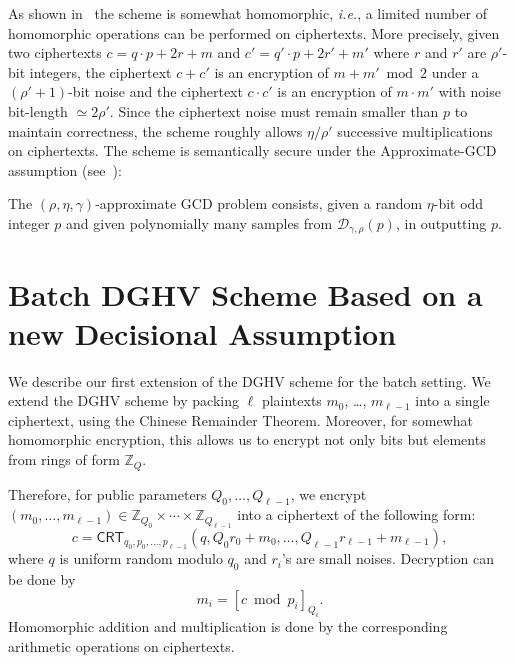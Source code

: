 \documentclass{llncs}
\newcommand{\ie}{\textsl{i.e.}\xspace}
\newcommand{\Z}{{\mathbb Z}}
\newcommand*{\crt}{\ensuremath{\mathsf{CRT}}}
\begin{document}
As shown in~\cite{vDGHV2010} the scheme is somewhat homomorphic, \ie, a
limited number of homomorphic operations can be performed on
ciphertexts. More precisely, given two ciphertexts $c=q \cdot p+2r+m$
and $c'=q' \cdot p+2r'+m'$ where $r$ and $r'$ are $\rho'$-bit
integers, the ciphertext $c+c'$ is an encryption of
$m + m' \bmod 2$ under a $(\rho'+1)$-bit noise and the ciphertext $c \cdot
c'$ is an encryption of $m \cdot m'$ with noise bit-length $\simeq
2 \rho'$. Since the ciphertext noise must remain smaller than $p$ to maintain correctness, 
the scheme roughly allows $\eta/\rho'$ successive multiplications on ciphertexts.
The scheme is semantically secure under the Approximate-GCD assumption
(see~\cite{vDGHV2010}):

\begin{definition}
\label{def:approxGCD}
 The 
  $(\rho,\eta,\gamma)$-approximate GCD problem consists, given a random $ \eta $-bit odd integer $ p $ and
  given  polynomially many samples from $ \mathcal{D}_{\gamma,\rho}(p) $, in outputting $p$.
\end{definition}

\section{Batch DGHV Scheme Based on a new Decisional Assumption}\label{sec:batch-decisional}

%

We describe our first extension of the DGHV scheme for the batch setting.  We extend the DGHV scheme
by packing $\ell$ plaintexts $m_0$, \dots, $m_{\ell-1}$ into a single
ciphertext, using the Chinese Remainder
Theorem.  Moreover, for somewhat homomorphic encryption, this allows us to encrypt not only bits
but elements from rings of form $\Z_Q$.

Therefore, for public parameters $Q_0,\ldots,Q_{\ell-1}$, we encrypt
$(m_0, \dots, m_{\ell-1})\in\Z_{Q_0}\times\cdots\times\Z_{Q_{\ell-1}}$
into a ciphertext 
of the following form:
\[
c=\crt_{q_0,p_0,\ldots,p_{\ell-1}}(q, Q_0 r_0+m_0,\ldots,Q_{\ell-1}r_{\ell-1}+m_{\ell-1}),
\]
where $q$ is uniform random modulo $q_0$ and $r_i$'s are small noises.  Decryption can be done by
\[
m_i=[c\bmod{p_i}]_{Q_i}.
\]
Homomorphic addition and multiplication is done by the
corresponding arithmetic operations on ciphertexts. 
\end{document}

